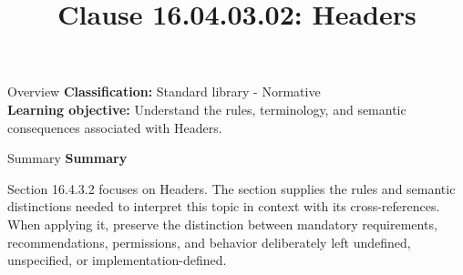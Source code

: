 \documentclass[10pt,letterpaper]{article}
\title{Clause 16.04.03.02: Headers}
\author{}
\date{}
\begin{document}
\maketitle
\begin{CornellOverviewBox}{Overview}
\textbf{Classification:} Standard library - Normative\\[2pt]
\textbf{Learning objective:} Understand the rules, terminology, and semantic consequences associated with Headers.
\end{CornellOverviewBox}\begin{CornellSummaryBox}{Summary}
{\sffamily\bfseries\color{Accent} Summary}\par\vspace{3pt}Section 16.4.3.2 focuses on Headers. The section supplies the rules and semantic distinctions needed to interpret this topic in context with its cross-references. When applying it, preserve the distinction between mandatory requirements, recommendations, permissions, and behavior deliberately left undefined, unspecified, or implementation-defined.
\end{CornellSummaryBox}
\end{document}
